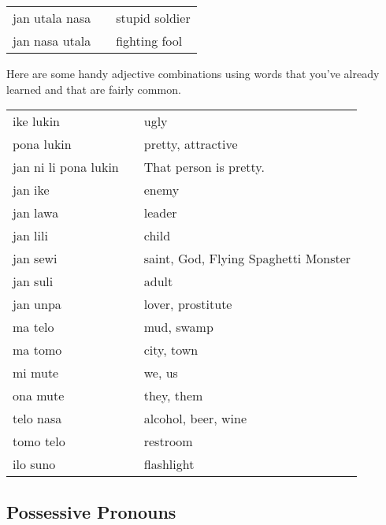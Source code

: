 \begin{supertabular}{p{5,5cm}|ll}
jan utala nasa && stupid soldier  \\
jan nasa utala && fighting fool \\
\end{supertabular}

Here are some handy adjective combinations using words that you've already learned and that are fairly common.

\begin{supertabular}{p{5,5cm}|ll}
ike lukin && ugly  \\
pona lukin && pretty, attractive \\
jan ni li pona lukin && That person is pretty. \\
jan ike && enemy \\
jan lawa && leader \\
jan lili && child \\
jan sewi && saint, God, Flying Spaghetti Monster \\
jan suli && adult \\
jan unpa && lover, prostitute \\
ma telo && mud, swamp \\
ma tomo && city, town \\
mi mute && we, us \\
ona mute && they, them \\
telo nasa && alcohol, beer, wine \\
tomo telo && restroom \\
ilo suno && flashlight \\ 
\end{supertabular} 
 
\subsection*{Possessive Pronouns}

